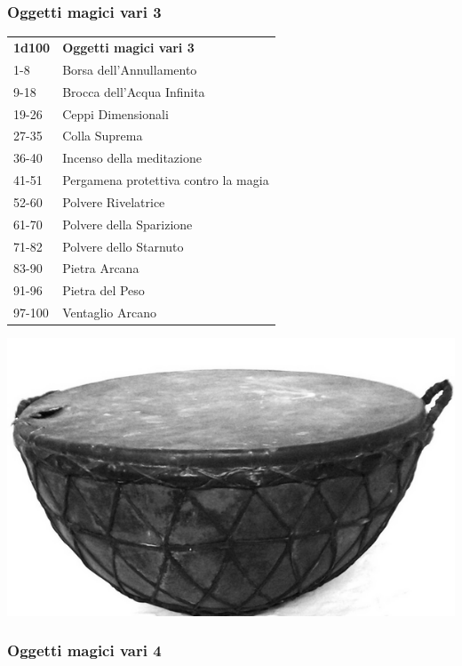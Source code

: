 \begin{multicols}{2}
	\medskip
	\subsubsection{Oggetti magici vari 3}

	\begin{tabularx}{0.45\textwidth}{lX}
		\textbf{1d100} & \textbf{Oggetti magici vari 3}\\
		1-8 &Borsa dell'Annullamento\\
		9-18 &Brocca dell'Acqua Infinita\\
		19-26& Ceppi Dimensionali\\
		27-35& Colla Suprema\\
		36-40& Incenso della meditazione\\
		41-51& Pergamena protettiva contro la magia\\
		52-60& Polvere Rivelatrice\\
		61-70& Polvere della Sparizione\\
		71-82& Polvere dello Starnuto\\
		83-90& Pietra Arcana\\
		91-96& Pietra del Peso\\
		97-100& Ventaglio Arcano\\
	\end{tabularx}

	\begin{center}
		\includegraphics[width=0.8\linewidth]{immagini/ancientdrum.png}
	\end{center}


	\subsubsection{Oggetti magici vari 4}


\end{multicols}
